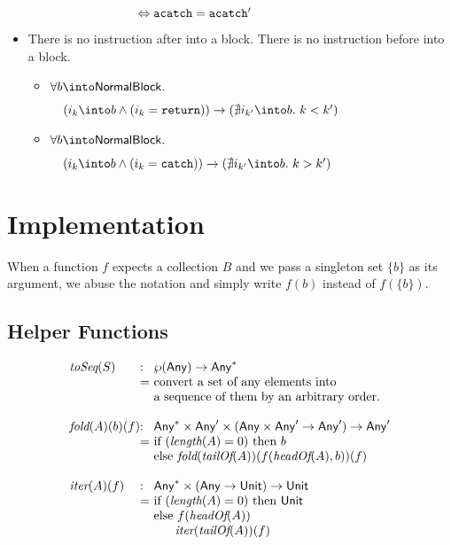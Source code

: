\begin{itemize}
\begin{itemize}
$\phantom{\quad\call = \call' }\Leftrightarrow \acatch = \acatch'$
\end{itemize}

\item There is no instruction after  into a block. There is no instruction before  into a block.
\begin{itemize}
\item $\forall b \into \NormalBlock.$

$\quad(i_k \into b \wedge (i_k = \TT{return})) \rightarrow (\nexists i_{k'} \into b.\ k < k')$
\item $\forall b \into \NormalBlock.$

$\quad(i_k \into b \wedge (i_k = \TT{catch})) \rightarrow (\nexists i_{k'} \into b.\ k > k')$
\end{itemize}
\end{itemize}

\section{\CFG Implementation}
When a function $f$ expects a collection $B$ and we pass a singleton set $\{b\}$
as its argument, we abuse the notation and simply write $f(b)$ instead of $f(\{b\})$.

\subsection{Helper Functions}
\[
\begin{array}{l@{}l@{~}l}
\toSeq(S) & : & \powerset{\Any} \rightarrow \Any^{*}\\
& = & \text{convert a set of any elements into}\\
& & \text{a sequence of them by an arbitrary order.}\\
& & \\

\fold(A)(b)(f) & : & \Any^{*} \times \Any' \times (\Any \times \Any' \rightarrow \Any') \rightarrow \Any'\\
& = & \mbox{if}\ (\length(A) = 0)\ \mbox{then}\ b \\
& & \mbox{else}\ \fold(\tailOf(A))(f(\headOf(A),b))(f)\\
& & \\

\iter(A)(f) & : & \Any^{*} \times (\Any \rightarrow \Unit) \rightarrow \Unit\\
& = & \mbox{if}\ (\length(A) = 0)\ \mbox{then}\ \Unit \\
& & \mbox{else}\ f(\headOf(A))\\
& & \phantom{else} \iter(\tailOf(A))(f)\\
\end{array}
\]

